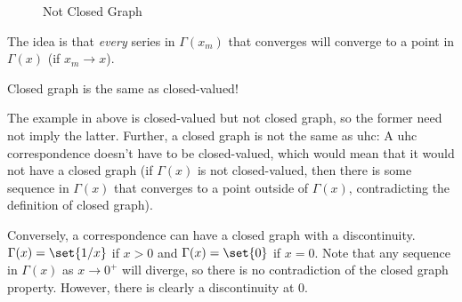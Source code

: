 \documentclass{article}
\begin{document}
\begin{figure}[H]
  \centering
  \caption{Not Closed Graph}
  \label{fig:not_closed_graph}
\end{figure}

The idea is that \textit{every} series in $\Gamma(x_m)$ that converges will converge to a point in $\Gamma(x)$ (if $x_m \to x$).
\begin{remark}
  Closed graph is  the same as closed-valued!

  The example in  above is closed-valued but not closed graph, so the former need not imply the latter. Further, a closed graph is not the same as uhc: A uhc correspondence doesn't have to be closed-valued, which would mean that it would not have a closed graph (if $\Gamma(x)$ is not closed-valued, then there is some sequence in $\Gamma(x)$ that converges to a point outside of $\Gamma(x)$, contradicting the definition of closed graph).

  Conversely, a correspondence can have a closed graph with a discontinuity. $\Gamma(x) = \set{1/x}$ if $x > 0$ and $\Gamma(x) = \set{0}$ if $x = 0$. Note that any sequence in $\Gamma(x)$ as $x \to 0^+$ will diverge, so there is no contradiction of the closed graph property. However, there is clearly a discontinuity at $0$.
\end{remark}
\end{document}
